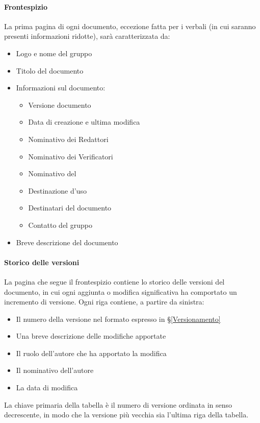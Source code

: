 			\paragraph{Frontespizio}\label{PS:Documentazione:Struttura:Frontespizio}
			La prima pagina di ogni documento, eccezione fatta per i verbali (in cui saranno presenti informazioni ridotte), sarà caratterizzata da:
			\begin{itemize}
				\item Logo e nome del gruppo
				\item Titolo del documento
				\item Informazioni sul documento:
					\begin{itemize}
						\item Versione documento
						\item Data di creazione e ultima modifica
						\item Nominativo dei Redattori
						\item Nominativo dei Verificatori
						\item Nominativo del \Res
						\item Destinazione d'uso
						\item Destinatari del documento
						\item Contatto del gruppo
					\end{itemize}
				\item Breve descrizione del documento
			\end{itemize}

			\paragraph{Storico delle versioni}\label{PS:Documentazione:Struttura:StoricoVersioni}
			La pagina che segue il frontespizio contiene lo storico delle versioni del documento, in cui ogni aggiunta o modifica significativa ha
			comportato un incremento di versione. Ogni riga contiene, a partire da sinistra:
			\begin{itemize}
				\item Il numero della versione nel formato espresso in \S\ref{Versionamento}
				\item Una breve descrizione delle modifiche apportate
				\item Il ruolo dell'autore che ha apportato la modifica
				\item Il nominativo dell'autore
				\item La data di modifica
			\end{itemize}
			La chiave primaria della tabella è il numero di versione ordinata in senso decrescente, in modo che la versione più vecchia sia
			l'ultima riga della tabella.

